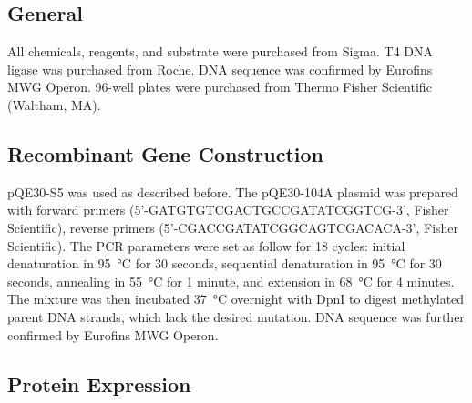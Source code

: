 \begin{refsection}
\subsection{General}

All chemicals, reagents, and substrate were purchased from Sigma. T4 DNA ligase
was purchased from Roche. DNA sequence was confirmed by Eurofins MWG Operon.
96-well plates were purchased from Thermo Fisher Scientific (Waltham, MA).

\subsection{Recombinant Gene Construction}

pQE30-S5 was used as described before. The pQE30-104A plasmid
was prepared with forward primers (5’-GATGTGTCGACTGCCGATATCGGTCG-3’, Fisher
Scientific), reverse primers (5’-CGACCGATATCGGCAGTCGACACA-3’, Fisher
Scientific). The PCR parameters were set as follow for 18 cycles: initial
denaturation in \SI{95}{\celsius} for 30 seconds, sequential denaturation in
\SI{95}{\celsius} for 30 seconds, annealing in \SI{55}{\celsius} for 1 minute,
and extension in \SI{68}{\celsius} for 4 minutes. The mixture was then
incubated \SI{37}{\celsius} overnight with DpnI to digest methylated parent DNA
strands, which lack the desired mutation. DNA sequence was further confirmed by
Eurofins MWG Operon.

\subsection{Protein Expression}


\end{refsection}

